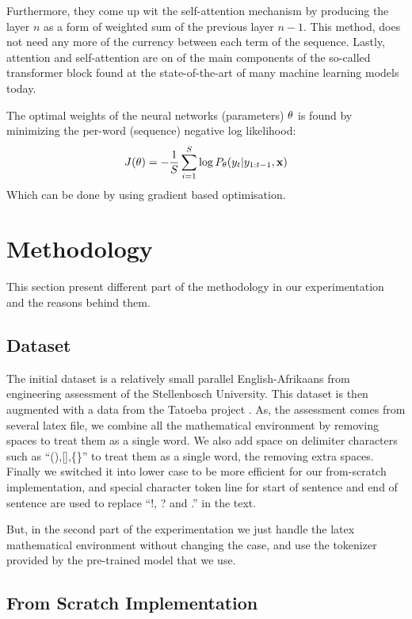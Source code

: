 Furthermore, they come up wit the self-attention mechanism by producing the layer  $n$ as a form of weighted sum of the previous layer $n-1$. This method, does not need any more of the currency between each term of the sequence. Lastly, attention and self-attention are on of the main components of the so-called transformer block found at the state-of-the-art of many machine learning models today.


The optimal weights of the neural networks (parameters) $\mathbf{\theta}$ is found by minimizing the per-word (sequence) negative log likelihood:
\begin{equation}
	J(\mathbf{\theta}) = -\frac{1}{S}\sum_{i=1}^{S}\log P_{\mathbf{\theta}}(y_t|y_{1:t-1}, \mathbf{x})
\end{equation}
Which can be done by using gradient based optimisation.

\section{Methodology}\label{mth}
This section present different part of the methodology in our experimentation and the reasons behind them.

\subsection{Dataset}
The initial dataset is a relatively small parallel English-Afrikaans from engineering assessment of the Stellenbosch University. This dataset is then augmented with a data from the Tatoeba project \cite{tatoeba}. As, the assessment comes from several latex file, we combine all the mathematical environment by removing spaces to treat them as a single word. We also add space on delimiter characters such as ``(),[],\{\}'' to treat them as a single word, the removing extra spaces. Finally we switched it into lower case to be more efficient for our from-scratch implementation, and special character token line for start of sentence and end of sentence are used to replace ``!, ? and .'' in the text.


But, in the second part of the experimentation we just handle the latex mathematical environment without changing the case, and use the tokenizer provided by the pre-trained model that we use.

\subsection{From Scratch Implementation}

